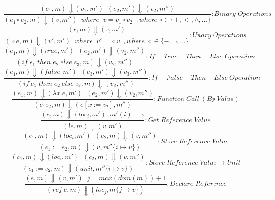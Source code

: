 \documentclass[a4paper]{article}
\begin{document}
\[\frac{(e_1, m) \Downarrow (v_1, m') \; \; (e_2, m') \Downarrow (v_2, m'') }{(e_1 \circ e_2, m) \Downarrow (v, m'') \; \; where \; \; v = v_1 \circ v_2 \;\;, where \; \circ \in \{ +, <, \wedge,... \} } : Binary \; Operations\]
\[\frac{(e, m) \Downarrow (v, m') }{(\diamond e, m) \Downarrow (v', m') \; \; where \; \; v' = \diamond v \;\;, where \; \diamond \in \{ -, \neg ,... \}} : Unary \; Operations\]
\[\frac{(e_1, m) \Downarrow (true, m') \; \; (e_2, m') \Downarrow (v_2, m'')}{(if \; e_1 \; then \; e_2 \; else \; e_3, m) \Downarrow (v_2, m'')} : If-True-Then-Else \; Operation\]
\[\frac{(e_1, m) \Downarrow (false, m') \; \; (e_3, m') \Downarrow (v_3, m'')}{(if \; e_1 \; then \; e_2 \; else \; e_3, m) \Downarrow (v_3, m'')} : If-False-Then-Else \; Operation\]
\[\frac{(e_1, m) \Downarrow (\lambda x.e, m') \; \; (e_2, m') \Downarrow (v_2, m'')}{(e_1 e_2 , m) \Downarrow (e[x := v_2], m'')} : Function \; Call \; (By \; Value)\]
\[\frac{(e, m) \Downarrow (loc_i, m') \; \; m'(i) = v }{(!e, m) \Downarrow (v, m')} : Get \; Reference \; Value \]
\[\frac{(e_1, m) \Downarrow (loc_i, m') \; \; (e_2, m) \Downarrow (v, m'') }{(e_1 := e_2, m) \Downarrow (v, m''\{i \mapsto v\})} : Store \; Reference \; Value \]
\[\frac{(e_1, m) \Downarrow (loc_i, m') \; \; (e_2, m) \Downarrow (v, m'') }{(e_1 := e_2, m) \Downarrow (unit, m''\{i \mapsto v\})} : Store \; Reference \; Value \rightarrow Unit\]
\[\frac{(e, m) \Downarrow (v, m') \; \; j = max(dom(m)) + 1 }{(ref \; e , m) \Downarrow (loc_j, m\{j \mapsto v\})} : Declare \; Reference \]
\end{document}
